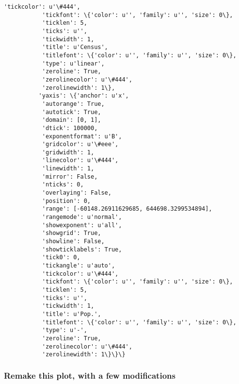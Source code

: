 \documentclass{article}
\begin{document}
\begin{Verbatim}[commandchars=\\\{\}]
           'tickcolor': u'\#444',
           'tickfont': \{'color': u'', 'family': u'', 'size': 0\},
           'ticklen': 5,
           'ticks': u'',
           'tickwidth': 1,
           'title': u'Census',
           'titlefont': \{'color': u'', 'family': u'', 'size': 0\},
           'type': u'linear',
           'zeroline': True,
           'zerolinecolor': u'\#444',
           'zerolinewidth': 1\},
          'yaxis': \{'anchor': u'x',
           'autorange': True,
           'autotick': True,
           'domain': [0, 1],
           'dtick': 100000,
           'exponentformat': u'B',
           'gridcolor': u'\#eee',
           'gridwidth': 1,
           'linecolor': u'\#444',
           'linewidth': 1,
           'mirror': False,
           'nticks': 0,
           'overlaying': False,
           'position': 0,
           'range': [-60148.26911629685, 644698.3299534894],
           'rangemode': u'normal',
           'showexponent': u'all',
           'showgrid': True,
           'showline': False,
           'showticklabels': True,
           'tick0': 0,
           'tickangle': u'auto',
           'tickcolor': u'\#444',
           'tickfont': \{'color': u'', 'family': u'', 'size': 0\},
           'ticklen': 5,
           'ticks': u'',
           'tickwidth': 1,
           'title': u'Pop.',
           'titlefont': \{'color': u'', 'family': u'', 'size': 0\},
           'type': u'-',
           'zeroline': True,
           'zerolinecolor': u'\#444',
           'zerolinewidth': 1\}\}\}
\end{Verbatim}
        

    \subsubsection{Remake this plot, with a few modifications}
\end{document}
